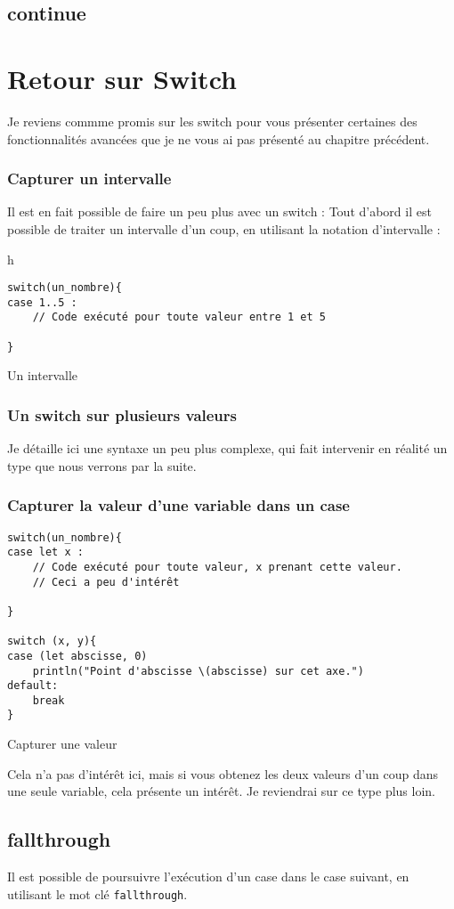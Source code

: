 \subsection{continue}

\section{Retour sur Switch}
Je reviens commme promis sur les switch pour vous présenter certaines des fonctionnalités avancées que je ne vous ai pas présenté au chapitre précédent.

\subsubsection{Capturer un intervalle} 
Il est en fait possible de faire un peu plus avec un switch :
Tout d'abord il est possible de traiter un intervalle d'un coup, en utilisant la notation d'intervalle :
\begin{listing}{h}
\begin{verbatim}
switch(un_nombre){
case 1..5 :
    // Code exécuté pour toute valeur entre 1 et 5

}
\end{verbatim}
\caption{Un intervalle}
\end{listing}
\subsubsection{Un switch sur plusieurs valeurs}
Je détaille ici une syntaxe un peu plus complexe, qui fait intervenir en réalité un type que nous verrons par la suite.

\subsubsection{Capturer la valeur d'une variable dans un case}

\begin{listing}[h]
\begin{verbatim}
switch(un_nombre){
case let x :
    // Code exécuté pour toute valeur, x prenant cette valeur.
    // Ceci a peu d'intérêt

}

switch (x, y){
case (let abscisse, 0)
    println("Point d'abscisse \(abscisse) sur cet axe.")
default:
    break
}

\end{verbatim}
\caption{Capturer une valeur}
\end{listing}%
Cela n'a pas d'intérêt ici, mais si vous obtenez les deux valeurs d'un coup dans une seule variable, cela présente un intérêt. Je reviendrai sur ce type plus loin.
\subsection{fallthrough}
Il est possible de poursuivre l'exécution d'un case dans le case suivant, en utilisant le mot clé \texttt{fallthrough}.